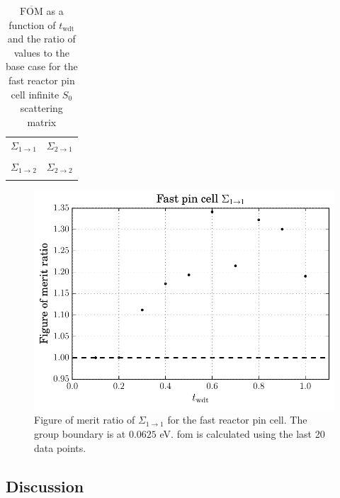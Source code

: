 \begin{table}[hbtp]
  \centering
  \caption[$\overline{\mathrm{FOM}}$ and ratio for
  the fast reactor pin cell infinite $S_0$ scattering matrix.]{$\overline{\mathrm{FOM}}$ as a function of
    $t_{\mathrm{wdt}}$ and the ratio of values to the base case for
    the fast reactor pin cell infinite $S_0$ scattering matrix}
  \begin{tabular}{cc} $\Sigma_{1\to 1}$ & $\Sigma_{2 \to 1}$ \\
 & 
 \\
$\Sigma_{1\to 2}$ & $\Sigma_{2 \to 2}$ \\
 & 
 
  \end{tabular}
  \label{tab:fast_inf_sp0}
\end{table}
\begin{figure}[hbtp]
  \centering
  \includegraphics[scale=0.9]{images/results/fast_inf_sp0_grp_1}
  \caption[Figure of merit ratio $\Sigma_{1 \to 1}$ for the fast reactor pin cell]{Figure of
    merit ratio of $\Sigma_{1 \to 1}$ for
    the fast reactor pin cell. The group boundary is at $0.0625$ eV. \gls{fom} is calculated
    using the last 20 data points.}
  \label{fig:fast_inf_sp0}
\end{figure}

\newpage

\subsection{Discussion}
\label{sec:fast_discussion}

